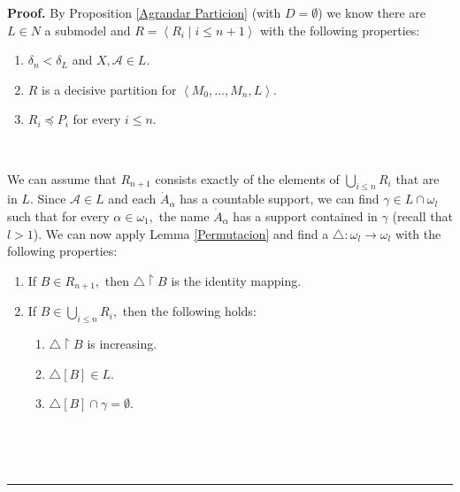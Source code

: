 \documentclass{article}%
\newenvironment{proof}[1][Proof]{\noindent\textbf{#1.} }{\ \rule{0.5em}{0.5em}}
\begin{document}
\begin{proof}
By Proposition \ref{Agrandar Particion} (with $D=\emptyset$) we know there are
$L\in N$ a submodel and $R=\left\langle R_{i}\mid i\leq n+1\right\rangle $
with the following properties:

\begin{enumerate}
\item $\delta_{n}<\delta_{L}$ and $X,\mathcal{A}\in L.$

\item $R$ is a decisive partition for $\left\langle M_{0},...,M_{n}%
,L\right\rangle .$

\item $R_{i}\preceq P_{i}$ for every $i\leq n.$
\end{enumerate}

\qquad\qquad\ \ 

We can assume that $R_{n+1}$ consists exactly of the elements of
$\bigcup\limits_{i\leq n}R_{i}$ that are in $L.$ Since $\mathcal{A}\in L$ and
each $\dot{A}_{\alpha}$ has a countable support, we can find $\gamma\in
L\cap\omega_{l}$ such that for every $\alpha\in\omega_{1},$ the name $\dot
{A}_{\alpha}$ has a support contained in $\gamma$ (recall that $l>1$). We can
now apply Lemma \ref{Permutacion} and find a $\triangle:\omega_{l}%
\longrightarrow\omega_{l}$ with the following properties:

\begin{enumerate}
\item If $B\in R_{n+1},$ then $\triangle\upharpoonright B$ is the identity mapping.

\item If $B\in\bigcup\limits_{i\leq n}R_{i},$ then the following holds:

\begin{enumerate}
\item $\triangle\upharpoonright B$ is increasing.

\item $\triangle\left[  B\right]  \in L.$

\item $\triangle\left[  B\right]  \cap\gamma=\emptyset.$
\end{enumerate}
\end{enumerate}

\qquad\ \ 


\end{proof}
\end{document}
